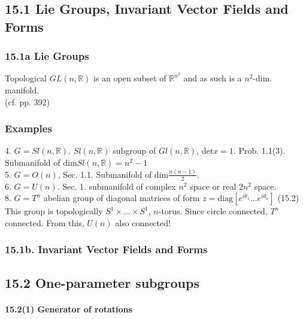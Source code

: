 \subsection{15.1 Lie Groups, Invariant Vector Fields and Forms}

\subsubsection{15.1a Lie Groups}

Topological $GL(n,\mathbb{R})$ is an open subset of $\mathbb{R}^{n^2}$ and as such is a $n^2$-dim. manifold. \\
(cf. pp. 392) \\
\subsubsection*{Examples}
4. $G = Sl(n,\mathbb{R})$.  $Sl(n,\mathbb{R})$ subgroup of $Gl(n,\mathbb{R})$, $\text{det}{x} = 1$.  Prob. 1.1(3). Submanifold of $\text{dim}{Sl(n,\mathbb{R})} = n^2 - 1$ \\
5. $G = O(n)$, Sec. 1.1. Submanifold of $\text{dim}{\frac{n(n-1)}{2} }$.  \\
6. $G = U(n)$.  Sec. 1. submanifold of complex $n^2$ space or real $2n^2$ space.  \\
8. $G = T^n$ abelian group of diagonal matrices of form $z = \text{diag}{[e^{i\theta_1} \dots e^{i \theta_n}]}$ (15.2) \\
\phantom{8. } This group is topologically $S^1 \times \dots \times S^1$, $n$-torus.  Since circle connected, $T^n$ connected.  From this, $U(n)$ also connected!  

\subsubsection{15.1b. Invariant Vector Fields and Forms}

\subsection{15.2 One-parameter subgroups}





\paragraph{15.2(1) Generator of rotations}






